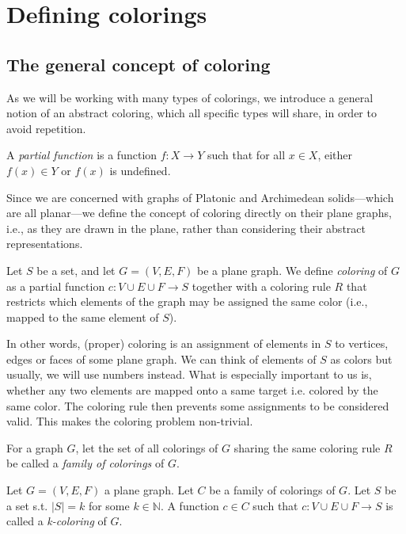 \chapter{Defining colorings}

\section{The general concept of coloring}

As we will be working with many types of colorings, we introduce a general notion of an abstract coloring, which all specific types will share, in order to avoid repetition.

\begin{defn}
    A \emph{partial function} is a function $f : X \rightarrow Y$ such that for all $x \in X$, either $f(x) \in Y$ or $f(x)$ is undefined.
\end{defn}

Since we are concerned with graphs of Platonic and Archimedean solids—which are all planar—we define the concept of coloring directly on their plane graphs, i.e., as they are drawn in the plane, rather than considering their abstract representations.

\begin{defn}[coloring]
    Let $S$ be a set, and let $G = (V,E,F)$ be a plane graph. We define \emph{coloring} of $G$ as a partial function $c : V \cup E \cup F \rightarrow S$ together with a coloring rule $R$ that restricts which elements of the graph may be assigned the same color (i.e., mapped to the same element of $S$).
\end{defn}

In other words, (proper) coloring is an assignment of elements in $S$ to vertices, edges or faces of some plane graph. We can think of elements of $S$ as colors but usually, we will use numbers instead. What is especially important to us is, whether any two elements are mapped onto a same target i.e. colored by the same color. The coloring rule then prevents some assignments to be considered valid. This makes the coloring problem non-trivial.

\begin{defn}
    For a graph $G$, let the set of all colorings of $G$ sharing the same coloring rule $R$ be called a \emph{family of colorings} of $G$.
\end{defn}

\begin{defn}[k-coloring]
    Let $G=(V,E,F)$ a plane graph. Let $C$ be a family of colorings of $G$. Let $S$ be a set s.t. $|S| = k$ for some $k \in \mathbb{N}$. A function $c \in C$ such that $c: V \cup E \cup F \rightarrow S$ is called a \emph{k-coloring} of $G$.
\end{defn}

